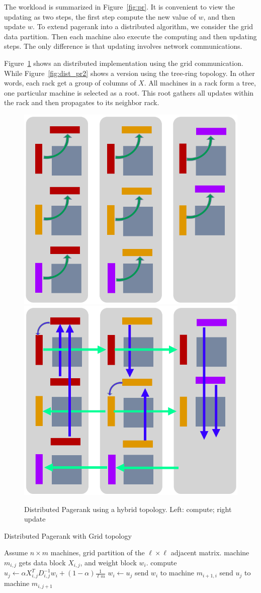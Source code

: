 \documentclass[11pt, twocolumn]{article}
\begin{document}
The workload is summarized in Figure~\ref{fig:pr}. It is convenient to view the
updating as two steps, the
first step compute the new value of $w$, and then update $w$. To extend pagerank
into a distributed algorithm, we consider the grid data partition. Then each
machine also execute the computing and then updating steps. The only difference
is that updating involves network communications.

Figure~\ref{fig:dist_pr} shows an distributed implementation using the grid
communication. While Figure~\ref{fig:dist_pr2} shows a version using the
tree-ring topology. In other words, each rack get a group of columns of $X$. All
machines in a rack form a tree, one particular machine is selected as a
root. This root gathers all updates within the rack and then propagates to its
neighbor rack.

\begin{figure}[th!]
  \centering
  \includegraphics[width=.4\textwidth]{fig/compute} \hspace{4ex}
  \includegraphics[width=.4\textwidth]{fig/update}
  \caption{Distributed Pagerank using a hybrid topology. Left: compute; right update}
  \label{fig:dist_pr}
\end{figure}


\begin{algorithm}[tb]
  \caption{Distributed Pagerank with Grid topology}
  \label{algo:pr}
  \begin{algorithmic}[1]
    \REQUIRE Assume $n\times m$ machines, grid partition of the $\ell \times \ell$
    adjacent matrix. machine
    $m_{i,j}$  gets data block $X_{i,j}$, and weight block $w_i$.
    \STATE compute $u_j \gets \alpha X_{i,j}^T D_{i,j}^{-1} w_i +
    (1-\alpha)\frac{1}{\ell m}$
    \STATE $w_i \gets u_j$
    \STATE send $w_i$ to machine $m_{i+1,i}$
    \ELSE
    \STATE send $u_j$ to machine $m_{i,j+1}$
    \ENDIF
    \ENDFOR
    \ENDFOR
  \end{algorithmic}
\end{algorithm}
\end{document}
